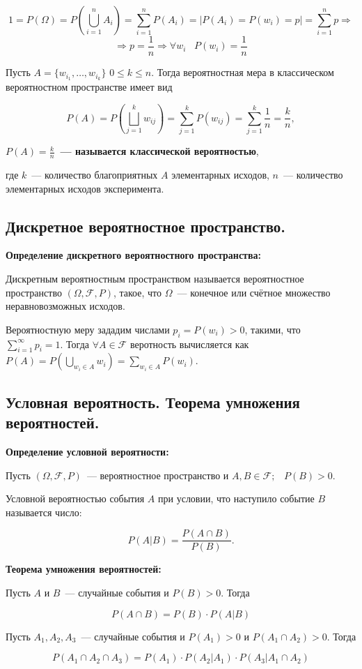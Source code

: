     \[
        1 = P(\Omega) = P(\bigcup^{n}_{i = 1} A_i) = \sum^{n}_{i = 1} P(A_i) =
        | P(A_i) = P(w_i) = p | = \sum^{n}_{i = 1} p \Rightarrow
    \]
    \[
        \Rightarrow p = \frac{1}{n} \Rightarrow \forall w_i \;\;\; P(w_i) =
        \frac{1}{n}  
    \]

    Пусть $A = \{w_{i_1}, \dots, w_{i_k}\}$ $0 \leq k \leq n$. Тогда
    вероятностная мера в классическом вероятностном пространстве имеет
    вид 

    \[
        P(A) = P \left( \bigsqcup^{k}_{j = 1} w_{ij} \right) =
        \sum^{k}_{j = 1} P(w_{ij}) = \sum^{k}_{j = 1} \frac{1}{n} = \frac{k}{n},  
    \]
    \bigskip

    \textbf{$P(A) = \frac{k}{n}$~--- называется классической вероятностью},

    где $k$~--- количество благоприятных $A$ элементарных исходов,
    $n$~--- количество элементарных исходов эксперимента.

\subsection{Дискретное вероятностное пространство.}

\textbf{Определение дискретного вероятностного пространства:}
    \smallskip

    Дискретным вероятностным пространством называется вероятностное
    пространство $(\Omega, \mathcal{F}, P)$, такое, что 
    $\Omega$~--- конечное или счётное множество неравновозможных исходов.
    \bigskip

    Вероятностную меру зададим числами $p_i = P(w_i) > 0$, такими, что
    $\sum^{\infty}_{i = 1} p_i = 1$. Тогда $\forall A \in \mathcal{F}$
    веротность вычисляется как $P(A) = P(\bigcup\limits_{w_i \in A} w_i) =
    \sum\limits_{w_i \in A} P (w_i)$.

\subsection{Условная вероятность. Теорема умножения вероятностей.}    

\textbf{Определение условной вероятности:}
    \smallskip

    Пусть $(\Omega, \mathcal{F}, P)$~--- вероятностное пространство и
    $A, B \in \mathcal{F}; \;\;\; P(B) > 0$. 

    Условной вероятностью события $A$ при условии, что наступило
    событие $B$ называется число:

    \[
        P(A|B) = \frac{P(A \cap B)}{P(B)}.  
    \]
    \bigskip

\textbf{Теорема умножения вероятностей:}
    \smallskip
    
    Пусть $A$ и $B$~--- случайные события и $P(B) > 0$. Тогда 

    \[
        P(A \cap B) = P(B) \cdot P(A|B)  
    \]
    \bigskip

    Пусть $A_1, A_2, A_3$~--- случайные события и $P(A_1) > 0$ и $P(A_1 \cap A_2) > 0$.
    Тогда

    \[
        P(A_1 \cap A_2 \cap A_3) = P(A_1) \cdot P(A_2|A_1) \cdot P(A_3|A_1 \cap A_2)  
    \]

